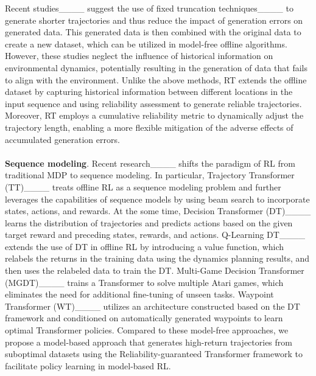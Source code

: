 Recent studies____ suggest the use of fixed truncation techniques____ to generate shorter trajectories and thus reduce the impact of generation errors on generated data.
This generated data is then combined with the original data to create a new dataset, which can be utilized in model-free offline algorithms.
However, these studies neglect the influence of historical information on environmental dynamics, potentially resulting in the generation of data that fails to align with the environment.
Unlike the above methods, RT extends the offline dataset by capturing historical information between different locations in the input sequence and using reliability assessment to generate reliable trajectories.
Moreover, RT employs a cumulative reliability metric to dynamically adjust the trajectory length, enabling a more flexible mitigation of the adverse effects of accumulated generation errors.
\\
\\
\textbf{Sequence modeling}.
Recent research____ shifts the paradigm of RL from traditional MDP to sequence modeling.
In particular, Trajectory Transformer (TT)____ treats offline RL as a sequence modeling problem and further leverages the capabilities of sequence models by using beam search to incorporate states, actions, and rewards.
At the some time, Decision Transformer (DT)____ learns the distribution of trajectories and predicts actions based on the given target reward and preceding states, rewards, and actions.
Q-Learning DT____ extends the use of DT in offline RL by introducing a value function, which relabels the returns in the training data using the dynamics planning results, and then uses the relabeled data to train the DT.
Multi-Game Decision Transformer (MGDT)____ trains a Transformer to solve multiple Atari games, which eliminates the need for additional fine-tuning of unseen tasks.
Waypoint Transformer (WT)____ utilizes an architecture constructed based on the DT framework and conditioned on automatically generated waypoints to learn optimal Transformer policies.
Compared to these model-free approaches, we propose a model-based approach that generates high-return trajectories from suboptimal datasets using the Reliability-guaranteed Transformer framework  to facilitate policy learning in model-based RL.